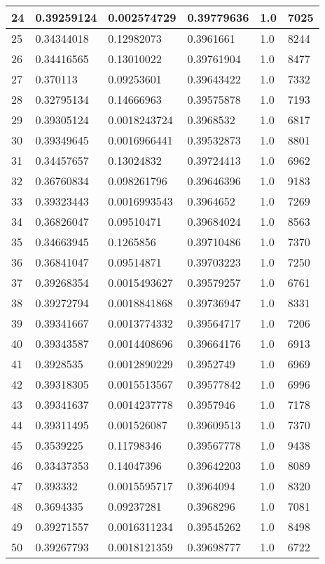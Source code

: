 \begin{longtable}{|l|l|l|l|l|l|}
24 & 0.39259124 & 0.002574729 & 0.39779636 & 1.0 & 7025 \\ \hline 
25 & 0.34344018 & 0.12982073 & 0.3961661 & 1.0 & 8244 \\ \hline 
26 & 0.34416565 & 0.13010022 & 0.39761904 & 1.0 & 8477 \\ \hline 
27 & 0.370113 & 0.09253601 & 0.39643422 & 1.0 & 7332 \\ \hline 
28 & 0.32795134 & 0.14666963 & 0.39575878 & 1.0 & 7193 \\ \hline 
29 & 0.39305124 & 0.0018243724 & 0.3968532 & 1.0 & 6817 \\ \hline 
30 & 0.39349645 & 0.0016966441 & 0.39532873 & 1.0 & 8801 \\ \hline 
31 & 0.34457657 & 0.13024832 & 0.39724413 & 1.0 & 6962 \\ \hline 
32 & 0.36760834 & 0.098261796 & 0.39646396 & 1.0 & 9183 \\ \hline 
33 & 0.39323443 & 0.0016993543 & 0.3964652 & 1.0 & 7269 \\ \hline 
34 & 0.36826047 & 0.09510471 & 0.39684024 & 1.0 & 8563 \\ \hline 
35 & 0.34663945 & 0.1265856 & 0.39710486 & 1.0 & 7370 \\ \hline 
36 & 0.36841047 & 0.09514871 & 0.39703223 & 1.0 & 7250 \\ \hline 
37 & 0.39268354 & 0.0015493627 & 0.39579257 & 1.0 & 6761 \\ \hline 
38 & 0.39272794 & 0.0018841868 & 0.39736947 & 1.0 & 8331 \\ \hline 
39 & 0.39341667 & 0.0013774332 & 0.39564717 & 1.0 & 7206 \\ \hline 
40 & 0.39343587 & 0.0014408696 & 0.39664176 & 1.0 & 6913 \\ \hline 
41 & 0.3928535 & 0.0012890229 & 0.3952749 & 1.0 & 6969 \\ \hline 
42 & 0.39318305 & 0.0015513567 & 0.39577842 & 1.0 & 6996 \\ \hline 
43 & 0.39341637 & 0.0014237778 & 0.3957946 & 1.0 & 7178 \\ \hline 
44 & 0.39311495 & 0.001526087 & 0.39609513 & 1.0 & 7370 \\ \hline 
45 & 0.3539225 & 0.11798346 & 0.39567778 & 1.0 & 9438 \\ \hline 
46 & 0.33437353 & 0.14047396 & 0.39642203 & 1.0 & 8089 \\ \hline 
47 & 0.393332 & 0.0015595717 & 0.3964094 & 1.0 & 8320 \\ \hline 
48 & 0.3694335 & 0.09237281 & 0.3968296 & 1.0 & 7081 \\ \hline 
49 & 0.39271557 & 0.0016311234 & 0.39545262 & 1.0 & 8498 \\ \hline 
50 & 0.39267793 & 0.0018121359 & 0.39698777 & 1.0 & 6722 \\ \hline 
\end{longtable}